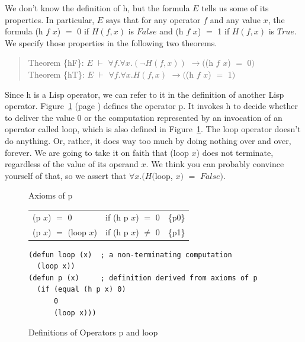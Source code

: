 We don't know the definition of \textsf{h}, but the formula $E$
tells us some of its properties.
In particular, $E$ says that for any operator $f$ and any value $x$,
the formula \textsf{(h $f$ $x$)} $=$ \textsf{0} if $H(f, x)$ is $False$ and
\textsf{(h $f$ $x$)} $=$ \textsf{1} if $H(f,x)$ is $True$.
We specify those properties in the following two theorems.
\begin{quote}
Theorem \{hF\}: $E$ $\vdash$ $\forall f.\forall x.(\neg H(f, x))$ $\rightarrow ($\textsf{(h $f$ $x$)} $=$ \textsf{0}$)$\\
Theorem \{hT\}: $E$ $\vdash$ $\forall f.\forall x.H(f, x)$      $\rightarrow ($\textsf{(h $f$ $x$)} $=$ \textsf{1}$)$
\end{quote}

Since \textsf{h} is a Lisp operator, we can refer to it in the definition of
another Lisp operator.
Figure~\ref{fig:paradox-op-defun} (page \pageref{fig:paradox-op-defun})
defines the operator \textsf{p}.
It invokes \textsf{h} to decide whether to deliver the value \textsf{0} or
the computation represented by an invocation of an operator called \textsf{loop},
which is also defined in
Figure~\ref{fig:paradox-op-defun}.
The \textsf{loop} operator doesn't do anything.
Or, rather,
it does way too much by doing nothing over and over, forever.
We are going to take it on faith that \textsf{(loop $x$)} does not terminate,
regardless of the value of its operand $x$.
We think you can probably convince yourself of that,
so we assert that $\forall x.(H($\textsf{loop}, $x)$ $=$ $False)$.

\begin{figure}
\begin{center}
Axioms of p\\
\begin{tabular}{lll}
\textsf{(p $x$)} $=$ \textsf{0}          & if \textsf{(h p $x$)} $=$ \textsf{0}    &\{p0\}\\
\textsf{(p $x$)} $=$ \textsf{(loop $x$)} & if \textsf{(h p $x$)} $\neq$ \textsf{0} &\{p1\}\\
\end{tabular}
\begin{Verbatim}
(defun loop (x)  ; a non-terminating computation
  (loop x))
(defun p (x)     ; definition derived from axioms of p
  (if (equal (h p x) 0)
      0
      (loop x)))
\end{Verbatim}
\end{center}
\caption{Definitions of Operators \textsf{p} and \textsf{loop}}
\label{fig:paradox-op-defun}
\end{figure}


